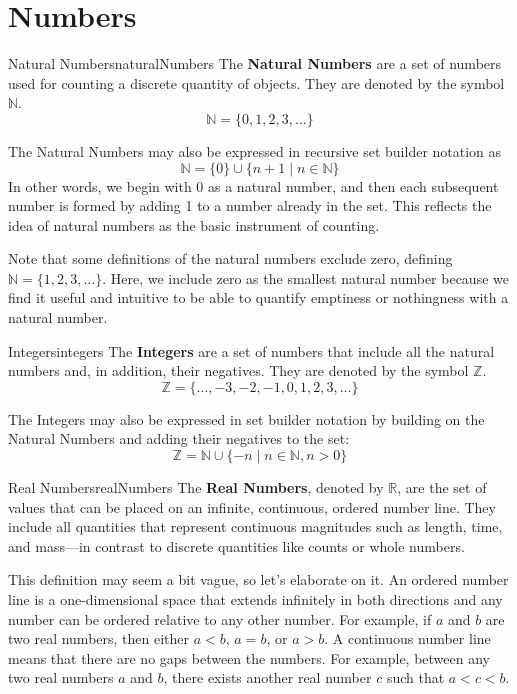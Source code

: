 \section{Numbers}
\label{sec:numbers}

\begin{definition}{Natural Numbers}{naturalNumbers}
  The \textbf{Natural Numbers} are a set of numbers used for counting a discrete
  quantity of objects. They are denoted by the symbol \(\mathbb{N}\).
  \[
    \mathbb{N} = \{0, 1, 2, 3, \ldots\}
  \]
\end{definition}

The Natural Numbers may also be expressed in recursive set builder notation as
\[
  \mathbb{N} = \{ 0 \} \cup \{ n + 1 \mid n \in \mathbb{N} \}
\]
In other words, we begin with 0 as a natural number, and then each subsequent number
is formed by adding 1 to a number already in the set. This reflects the idea of
natural numbers as the basic instrument of counting.

Note that some definitions of the natural numbers exclude zero, defining
\(\mathbb{N} = \{1, 2, 3, \ldots\}\). Here, we include zero as the smallest natural
number because we find it useful and intuitive to be able to quantify emptiness
or nothingness with a natural number.

\begin{definition}{Integers}{integers}
  The \textbf{Integers} are a set of numbers that include all the natural numbers
  and, in addition, their negatives.
  They are denoted by the symbol \(\mathbb{Z}\).
  \[
    \mathbb{Z} = \{\ldots, -3, -2, -1, 0, 1, 2, 3, \ldots\}
  \]
\end{definition}

The Integers may also be expressed in set builder notation by building on the Natural Numbers
and adding their negatives to the set:
\[
  \mathbb{Z} = \mathbb{N} \cup \{-n \mid n \in \mathbb{N}, n > 0\}
\]

\begin{definition}{Real Numbers}{realNumbers}
  The \textbf{Real Numbers}, denoted by \(\mathbb{R}\), are the set of values that can be placed
  on an infinite, continuous, ordered number line. They include all quantities that represent
  continuous magnitudes such as length, time, and mass—in contrast to discrete quantities like
  counts or whole numbers.
\end{definition}

This definition may seem a bit vague, so let's elaborate on it. An ordered number line is a
one-dimensional space that extends infinitely in both directions and any number can be
ordered relative to any other number. For example, if \( a \) and \( b \) are two real numbers,
then either \(a < b\), \(a = b\), or \(a > b\). A continuous number line means that there are
no gaps between the numbers. For example, between any two real numbers \( a \) and \( b \), there
exists another real number \( c \) such that \(a < c < b\).

